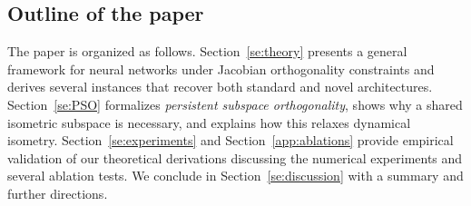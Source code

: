 \documentclass{article}
\theoremstyle{plain}
\theoremstyle{definition}
\theoremstyle{definition}
\theoremstyle{remark}
\theoremstyle{definition}
\theoremstyle{definition}
\theoremstyle{remark}
\numberwithin{equation}{section}
\begin{document}
\subsection*{Outline of the paper}

The paper is organized as follows. Section~\ref{se:theory} presents a general framework for neural networks under Jacobian orthogonality constraints and derives several instances that recover both standard and novel architectures. Section~\ref{se:PSO} formalizes \emph{persistent subspace orthogonality}, shows why a shared isometric subspace is necessary, and explains how this relaxes dynamical isometry. Section~\ref{se:experiments} and Section~\ref{app:ablations} provide empirical validation of our theoretical derivations discussing the numerical experiments and several ablation tests. We conclude in Section~\ref{se:discussion} with a summary and further directions.
\end{document}
